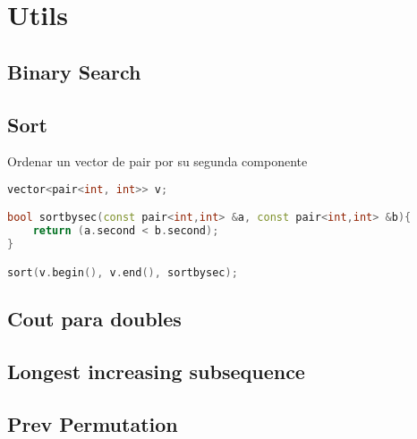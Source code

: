 \section{Utils}

\subsection{Binary Search}


\subsection{Sort}
Ordenar un vector de pair por su segunda componente
\begin{lstlisting}[language=C++]
vector<pair<int, int>> v;

bool sortbysec(const pair<int,int> &a, const pair<int,int> &b){
	return (a.second < b.second);
}

sort(v.begin(), v.end(), sortbysec);
\end{lstlisting}
\subsection{Cout para doubles}

\subsection{Longest increasing subsequence}


\subsection{Prev Permutation}


\newpage
